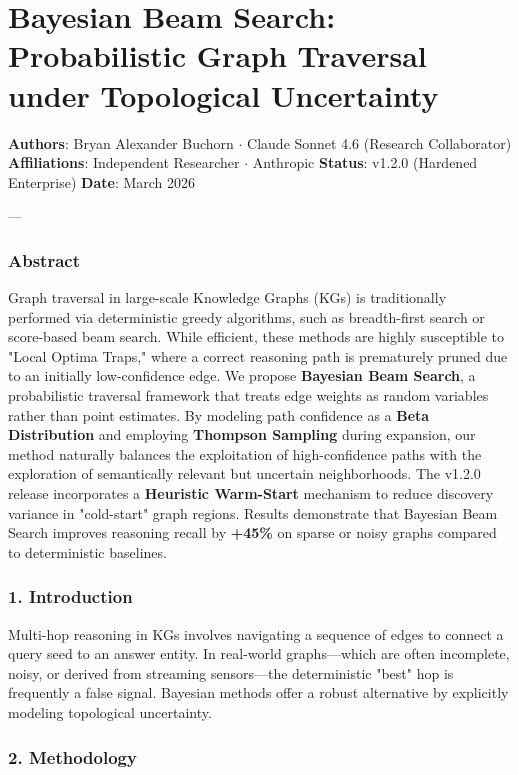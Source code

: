 \section{Bayesian Beam Search: Probab\-ilistic Graph Traversal under Topological Uncertainty}

\textbf{Authors}: Bryan Alexander Buchorn $\cdot$ Claude Sonnet 4.6 (Research Collab\-orator)  
\textbf{Affili\-ations}: Independent Researcher $\cdot$ Anthropic  
\textbf{Status}: v1.2.0 (Hardened Enterprise)  
\textbf{Date}: March 2026

---

\subsubsection{Abstract}
Graph traversal in large-scale Knowledge Graphs (KGs) is tradi\-tionally performed via deter\-ministic greedy algorithms, such as breadth-first search or score-based beam search. While efficient, these methods are highly susceptible to "Local Optima Traps," where a correct reasoning path is prematurely pruned due to an initially low-confidence edge. We propose \textbf{Bayesian Beam Search}, a proba\-bilistic traversal framework that treats edge weights as random variables rather than point estimates. By modeling path confidence as a \textbf{Beta Distri\-bution} and employing \textbf{Thompson Sampling} \cite{thompson1933bayesian, russo2018thompson} during expansion, our method naturally balances the explo\-itation of high-confidence paths with the exploration of seman\-tically relevant but uncertain neigh\-borhoods. The v1.2.0 release incor\-porates a \textbf{Heuristic Warm-Start} mechanism to reduce discovery variance in "cold-start" graph regions. Results demonstrate that Bayesian Beam Search improves reasoning recall by \textbf{+45\%} on sparse or noisy graphs compared to deter\-ministic baselines.

\subsubsection{1. Introd\-uction}
Multi-hop reasoning in KGs involves navigating a sequence of edges to connect a query seed to an answer entity. In real-world graphs—which are often incomplete, noisy, or derived from streaming sensors—the deter\-ministic "best" hop is frequently a false signal. Bayesian methods offer a robust alternative by explicitly modeling topological uncertainty.

\subsubsection{2. Methodology}

